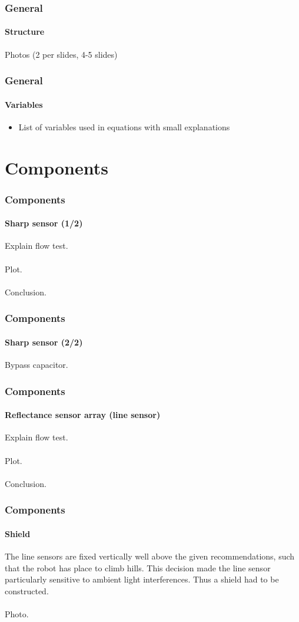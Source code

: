 \documentclass{beamer}
\begin{document}

\begin{frame}
\frametitle{General}
\framesubtitle{Structure}
Photos (2 per slides, 4-5 slides)
\end{frame}


\begin{frame}
\frametitle{General}
\framesubtitle{Variables}
\begin{itemize}
\item List of variables used in equations with small explanations
\end{itemize}
\end{frame}

\section{Components} 

\begin{frame}
\frametitle{Components}
\framesubtitle{Sharp sensor (1/2)}
Explain flow test.\\~\\
Plot.\\~\\
Conclusion.
\end{frame}


\begin{frame}
\frametitle{Components}
\framesubtitle{Sharp sensor (2/2)}
Bypass capacitor.
\end{frame}


\begin{frame}
\frametitle{Components}
\framesubtitle{Reflectance sensor array (line sensor)}
Explain flow test.\\~\\
Plot.\\~\\
Conclusion.
\end{frame}


\begin{frame}
\frametitle{Components}
\framesubtitle{Shield}
The line sensors are fixed vertically well above the given recommendations, such that the robot has place to climb hills. This decision made the line sensor 
particularly sensitive to ambient light interferences. Thus a shield had to be constructed. \\~\\
Photo.
\end{frame}
\end{document}
